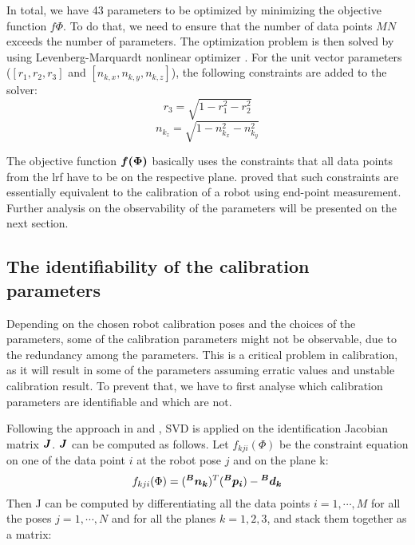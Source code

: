 In total, we have 43 parameters to be optimized by minimizing the objective function $f{\Phi}$. To do that, we need to ensure that the number of data points $MN$ exceeds the number of parameters. The optimization problem is then solved by using Levenberg-Marquardt nonlinear optimizer \cite{Newville2014}. For the unit vector parameters ($[r_1, r_2, r_3]$ and  $[n_{k,x}, n_{k,y}, n_{k,z}]$), the following constraints are added to the solver:
\begin{equation}
\label{eq:10}
r_3 = \sqrt{1 - r_1^2 - r_2^2}
\end{equation}
\begin{equation}
\label{eq:11}
n_{k_z} = \sqrt{1 - n_{k_x}^2 - n_{k_y}^2}
\end{equation}


The objective function $\vb*{f(\Phi)}$ basically uses the constraints that all data points from the \ac{lrf} have to be on the respective plane. \cite{Zhuang1999} proved that such constraints are essentially equivalent to the calibration of a robot using end-point measurement. Further analysis on the observability of the parameters will be presented on the next section. 

\subsection{The identifiability of the calibration parameters}
\label{sec:third_step}

Depending on the chosen robot calibration poses and the choices of the parameters, some of the calibration parameters might not be observable, due to the redundancy among the parameters. This is a critical problem in calibration, as it will result in some of the parameters assuming erratic values and unstable calibration result. To prevent that, we have to first analyse which calibration parameters are identifiable and which are not. 

Following the approach in \cite{Hollerbach1996} and \cite{Joubair2015}, SVD is applied on the identification Jacobian matrix $\vb*{J}$. $\vb*{J}$ can be computed as follows. Let  $f_{kji}(\Phi)$ be the constraint equation on one of the data point $i$ at the robot pose $j$ and on the plane k:
\begin{equation}
 f_{kji}(\Phi) =  (\vb*{{^B}n_k}) ^T (\vb*{{^B}p_i}) - \vb*{{^B}d_k}
\end{equation}
Then J can be computed by differentiating all the data points $i = 1, \cdots, M$ for all the poses $j = 1, \cdots, N$ and for all the planes $k=1,2,3$, and stack them together as a matrix:

